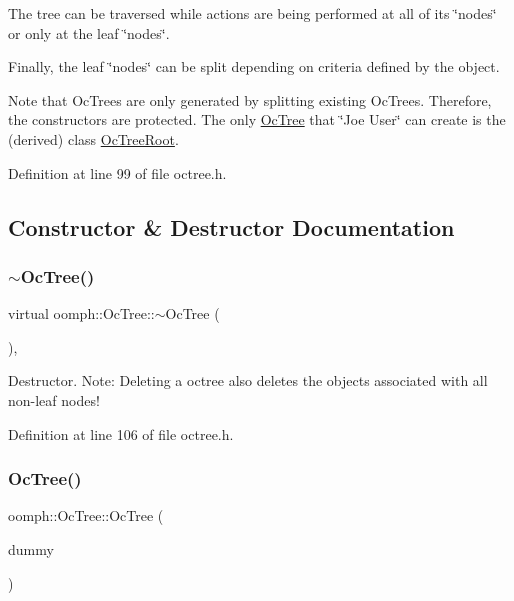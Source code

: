The tree can be traversed while actions are being performed at all of its \char`\"{}nodes\char`\"{} or only at the leaf \char`\"{}nodes\char`\"{}.

Finally, the leaf \char`\"{}nodes\char`\"{} can be split depending on criteria defined by the object.

Note that Oc\+Trees are only generated by splitting existing Oc\+Trees. Therefore, the constructors are protected. The only \hyperlink{classoomph_1_1OcTree}{Oc\+Tree} that \char`\"{}\+Joe User\char`\"{} can create is the (derived) class \hyperlink{classoomph_1_1OcTreeRoot}{Oc\+Tree\+Root}. 

Definition at line 99 of file octree.\+h.



\subsection{Constructor \& Destructor Documentation}
\mbox{\label{classoomph_1_1OcTree_a5c7bf77c8700898c428dacbdff6b334c}} 
\subsubsection{\texorpdfstring{$\sim$\+Oc\+Tree()}{~OcTree()}}
{\footnotesize\ttfamily virtual oomph\+::\+Oc\+Tree\+::$\sim$\+Oc\+Tree (\begin{DoxyParamCaption}{ }\end{DoxyParamCaption})\hspace{0.3cm}{\ttfamily [inline]}, {\ttfamily [virtual]}}



Destructor. Note\+: Deleting a octree also deletes the objects associated with all non-\/leaf nodes! 



Definition at line 106 of file octree.\+h.

\mbox{\label{classoomph_1_1OcTree_af9ead3a5abe10fff53b45e1a6b4adb97}} 
\subsubsection{\texorpdfstring{Oc\+Tree()}{OcTree()}\hspace{0.1cm}{\footnotesize\ttfamily [1/4]}}
{\footnotesize\ttfamily oomph\+::\+Oc\+Tree\+::\+Oc\+Tree (\begin{DoxyParamCaption}\item[{const \hyperlink{classoomph_1_1OcTree}{Oc\+Tree} \&}]{dummy }\end{DoxyParamCaption})\hspace{0.3cm}{\ttfamily [inline]}}



